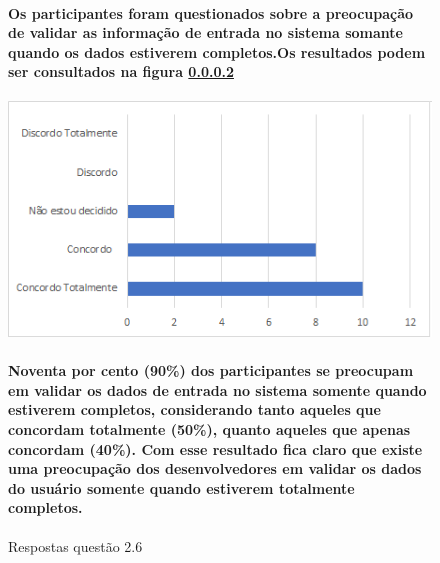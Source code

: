 \begin{figure}[!t]
\centering
\paragraph{
Os participantes foram questionados sobre a preocupação de validar as informação de entrada no sistema somante quando os dados estiverem completos.Os resultados podem ser consultados na figura \ref{fig:2.6}
}
\includegraphics[scale=0.7]{figuras das questoes/2.6.png}
\caption{Respostas questão 2.6}

\paragraph{
Noventa por cento (90{\%}) dos participantes se preocupam em validar os dados de entrada no sistema somente quando estiverem completos, considerando tanto aqueles que concordam totalmente (50{\%}), quanto aqueles que apenas concordam (40{\%}). Com esse resultado fica claro que existe uma preocupação dos desenvolvedores em validar os dados do usuário somente quando estiverem totalmente completos.
}
\label{fig:2.6}
\end{figure}
